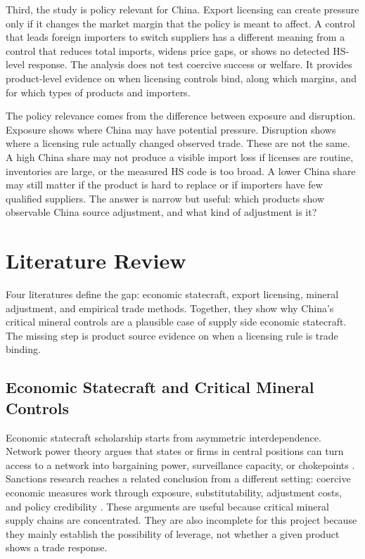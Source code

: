 \documentclass[12pt,a4paper]{article}
\numberwithin{equation}{section}
\begin{document}
Third, the study is policy relevant for China. Export licensing can create pressure only if it changes the market margin that the policy is meant to affect. A control that leads foreign importers to switch suppliers has a different meaning from a control that reduces total imports, widens price gaps, or shows no detected HS-level response. The analysis does not test coercive success or welfare. It provides product-level evidence on when licensing controls bind, along which margins, and for which types of products and importers.

The policy relevance comes from the difference between exposure and disruption. Exposure shows where China may have potential pressure. Disruption shows where a licensing rule actually changed observed trade. These are not the same. A high China share may not produce a visible import loss if licenses are routine, inventories are large, or the measured HS code is too broad. A lower China share may still matter if the product is hard to replace or if importers have few qualified suppliers. The answer is narrow but useful: which products show observable China source adjustment, and what kind of adjustment is it?

\section{Literature Review}

Four literatures define the gap: economic statecraft, export licensing, mineral adjustment, and empirical trade methods. Together, they show why China's critical mineral controls are a plausible case of supply side economic statecraft. The missing step is product source evidence on when a licensing rule is trade binding.

\subsection{Economic Statecraft and Critical Mineral Controls}

Economic statecraft scholarship starts from asymmetric interdependence. Network power theory argues that states or firms in central positions can turn access to a network into bargaining power, surveillance capacity, or chokepoints \citep{farrell2019weaponized}. Sanctions research reaches a related conclusion from a different setting: coercive economic measures work through exposure, substitutability, adjustment costs, and policy credibility \citep{egger2024sanctions}. These arguments are useful because critical mineral supply chains are concentrated. They are also incomplete for this project because they mainly establish the possibility of leverage, not whether a given product shows a trade response.
\end{document}
